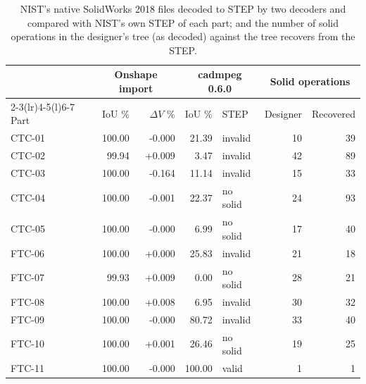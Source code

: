 \begin{table}[t]
\centering\small
\begin{tabular}{@{}lrrrlrr@{}}
\toprule
& \multicolumn{2}{c}{Onshape import} & \multicolumn{2}{c}{cadmpeg 0.6.0} & \multicolumn{2}{c}{Solid operations} \\
\cmidrule(lr){2-3}\cmidrule(lr){4-5}\cmidrule(l){6-7}
Part & IoU \% & $\Delta V$ \% & IoU \% & STEP & Designer & Recovered \\
\midrule
CTC-01 & 100.00 & -0.000 & 21.39 & invalid & 10 & 39 \\
CTC-02 & 99.94 & +0.009 & 3.47 & invalid & 42 & 89 \\
CTC-03 & 100.00 & -0.164 & 11.14 & invalid & 15 & 33 \\
CTC-04 & 100.00 & -0.001 & 22.37 & no solid & 24 & 93 \\
CTC-05 & 100.00 & -0.000 & 6.99 & no solid & 17 & 40 \\
FTC-06 & 100.00 & +0.000 & 25.83 & invalid & 21 & 18 \\
FTC-07 & 99.93 & +0.009 & 0.00 & no solid & 28 & 21 \\
FTC-08 & 100.00 & +0.008 & 6.95 & invalid & 30 & 32 \\
FTC-09 & 100.00 & -0.000 & 80.72 & invalid & 33 & 40 \\
FTC-10 & 100.00 & +0.001 & 26.46 & no solid & 19 & 25 \\
FTC-11 & 100.00 & -0.000 & 100.00 & valid & 1 & 1 \\
\bottomrule
\end{tabular}
\caption{NIST's native SolidWorks 2018 files decoded to STEP by two decoders and compared with NIST's own STEP of each part; and the number of solid operations in the designer's tree (as decoded) against the tree  recovers from the STEP.}
\label{tab:native}
\end{table}

